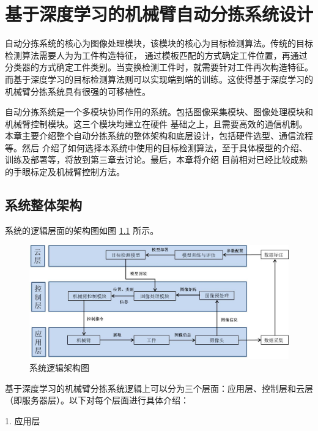 
\chapter{基于深度学习的机械臂自动分拣系统设计}

自动分拣系统的核心为图像处理模块，该模块的核心为目标检测算法。传统的目标检测算法需要人为为工件构造特征，
通过模板匹配的方式确定工件位置，再通过分类器的方式确定工件类别。当变换检测工件时，就需要针对工件再次构造特征。
而基于深度学习的目标检测算法则可以实现端到端的训练。这使得基于深度学习的机械臂分拣系统具有很强的可移植性。

自动分拣系统是一个多模块协同作用的系统。包括图像采集模块、图像处理模块和机械臂控制模块。这三个模块均建立在硬件
基础之上，且需要高效的通信机制。本章主要介绍整个自动分拣系统的整体架构和底层设计，包括硬件选型、通信流程等。然后
介绍了如何选择本系统中使用的目标检测算法，至于具体模型的介绍、训练及部署等，将放到第三章去讨论。最后，本章将介绍
目前相对已经比较成熟的手眼标定及机械臂控制方法。

\section{系统整体架构}

系统的逻辑层面的架构图如图    \ref{fig:total_construct}
所示。

\begin{figure}[htbp]
    \centering
    \includegraphics[width=\textwidth]{pic/chap2/total_construct.jpg}
    \caption{系统逻辑架构图}
    \label{fig:total_construct}
\end{figure}

基于深度学习的机械臂分拣系统逻辑上可以分为三个层面：应用层、控制层和云层（即服务器层）。以下对每个层面进行具体介绍：

1. 应用层

